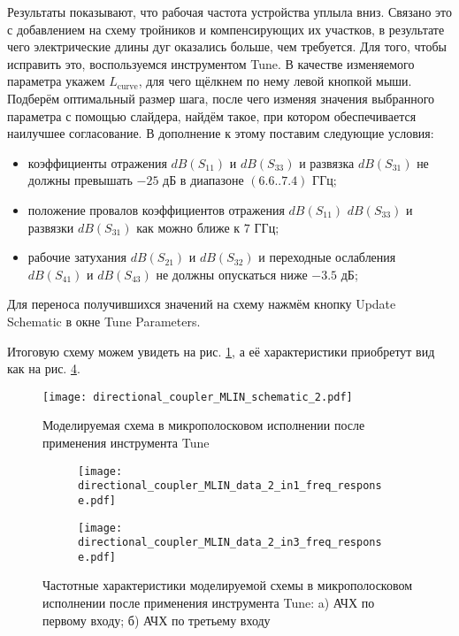 Результаты показывают, что рабочая частота устройства уплыла вниз. Связано это с добавлением на схему тройников и компенсирующих их участков, в результате чего электрические длины дуг оказались больше, чем требуется.
Для того, чтобы исправить это, воспользуемся инструментом Tune.
В качестве изменяемого параметра укажем $L_\text{curve}$, для чего щёлкнем по нему левой кнопкой мыши.
Подберём оптимальный размер шага, после чего изменяя значения выбранного параметра с помощью слайдера, найдём такое, при котором обеспечивается наилучшее согласование.
В дополнение к этому поставим следующие условия:
\begin{itemize}
    \item коэффициенты отражения $dB(S_{11})$ и $dB(S_{33})$ и развязка $dB(S_{31})$ не должны превышать $-25 \text{~дБ}$ в диапазоне $(6.6 .. 7.4) \text{~ГГц}$;
    \item положение провалов коэффициентов отражения $dB(S_{11})$ $dB(S_{33})$ и развязки $dB(S_{31})$ как можно ближе к $7 \text{~ГГц}$;
    \item рабочие затухания $dB(S_{21})$ и $dB(S_{32})$ и переходные ослабления $dB(S_{41})$ и $dB(S_{43})$ не должны опускаться ниже $-3.5 \text{~дБ}$;
\end{itemize}
Для переноса получившихся значений на схему нажмём кнопку Update Schematic в окне Tune Parameters.

Итоговую схему можем увидеть на рис. \ref{fig:directional_coupler_MLIN_schematic_2}, а её характеристики приобретут вид как на рис. \ref{fig:directional_coupler_MLIN_data_2}.

\begin{figure}
    \centering
    \texttt{[image: directional\_coupler\_MLIN\_schematic\_2.pdf]}
    \caption{Моделируемая схема в микрополосковом исполнении после применения инструмента Tune}
    \label{fig:directional_coupler_MLIN_schematic_2}
\end{figure}

\begin{figure}[!ht]
    \centering
    \begin{subfigure}[b]{0.45\textwidth}
        \centering
        \texttt{[image: directional\_coupler\_MLIN\_data\_2\_in1\_freq\_response.pdf]}
        \caption{}
        \label{fig:directional_coupler_MLIN_data_2_in1_freq_response}
    \end{subfigure}
    \hfill
    \begin{subfigure}[b]{0.45\textwidth}
        \centering
        \texttt{[image: directional\_coupler\_MLIN\_data\_2\_in3\_freq\_response.pdf]}
        \caption{}
        \label{fig:directional_coupler_MLIN_data_2_in3_freq_response}
    \end{subfigure}
    \caption{
        Частотные характеристики моделируемой схемы в микрополосковом исполнении после применения инструмента Tune:
        a) АЧХ по первому входу;
        б) АЧХ по третьему входу
    }
    \label{fig:directional_coupler_MLIN_data_2}
\end{figure}

